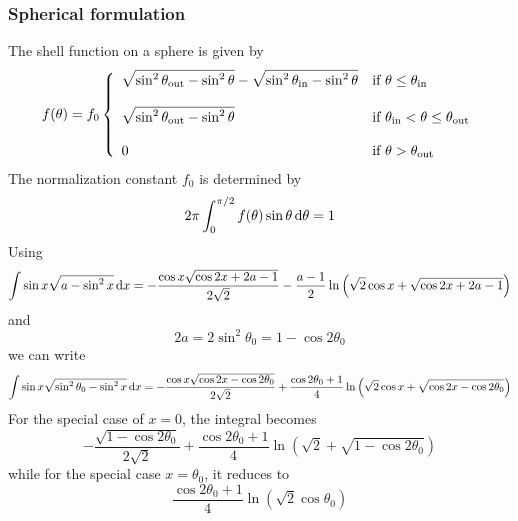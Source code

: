 \documentclass{article}[12pt,a4]
\begin{document}
\subsubsection{Spherical formulation}
 
The shell function on a sphere is given by
\begin{equation}
f(\theta) = f_0 \left \{
   \begin{array}{l l}
      \displaystyle
      \sqrt{ \sin^2 \theta_{\rm out} - \sin^2 \theta } - \sqrt{ \sin^2 \theta_{\rm in} - \sin^2 \theta }
      & \mbox{if $\theta \le \theta_{\rm in}$} \\
      \\
     \displaystyle
      \sqrt{ \sin^2 \theta_{\rm out} - \sin^2 \theta }
      & \mbox{if $\theta_{\rm in} < \theta \le \theta_{\rm out}$} \\
      \\
     \displaystyle
     0 & \mbox{if $\theta > \theta_{\rm out}$}
   \end{array}
   \right .
\end{equation}
The normalization constant $f_0$ is determined by
\begin{equation}
2 \pi \int_0^{\pi/2} f(\theta) \sin \theta \, {\rm d}\theta = 1
\end{equation}
Using
\begin{equation}
\int \sin x \sqrt {a - \sin^2 x} \, {\rm d}x = 
-\frac{\cos x \sqrt{\cos 2x + 2a-1}}{2 \sqrt{2}}
-\frac{a-1}{2} \ln \left( \sqrt{2} \cos x + \sqrt{\cos 2x + 2a-1} \right)
\end{equation}
and
\begin{equation}
2 a = 2\sin^2 \theta_0 = 1-\cos 2 \theta_0
\end{equation}
we can write
\begin{equation}
\int \sin x \sqrt {\sin^2 \theta_0 - \sin^2 x} \, {\rm d}x =
-\frac{\cos x \sqrt{\cos 2x - \cos 2\theta_0}}{2 \sqrt{2}}
+\frac{\cos 2\theta_0+1}{4} \ln \left( \sqrt{2} \cos x + \sqrt{\cos 2x - \cos 2\theta_0} \right)
\end{equation}
For the special case of $x=0$, the integral becomes
\begin{equation}
-\frac{\sqrt{1 - \cos 2\theta_0}}{2 \sqrt{2}}
+\frac{\cos 2\theta_0+1}{4} \ln \left( \sqrt{2} + \sqrt{1 - \cos 2\theta_0} \right)
\end{equation}
while for the special case $x=\theta_0$, it reduces to
\begin{equation}
\frac{\cos 2\theta_0+1}{4} \ln \left( \sqrt{2} \cos \theta_0 \right)
\end{equation}
\end{document}

